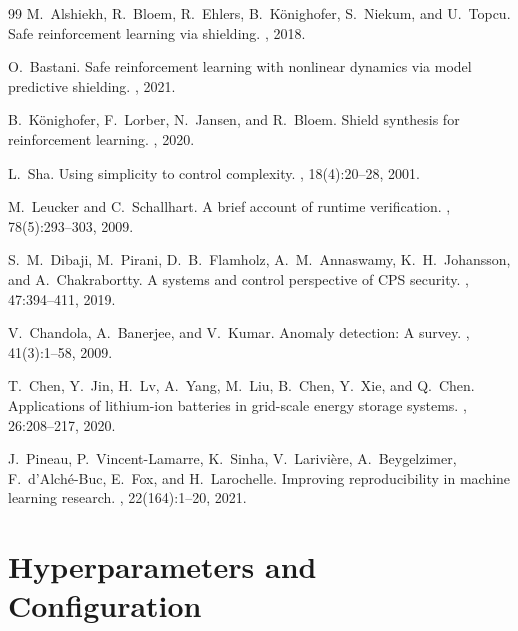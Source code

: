 \documentclass[11pt,a4paper,twocolumn]{article}
\begin{document}
\begin{thebibliography}{99}
M.~Alshiekh, R.~Bloem, R.~Ehlers, B.~K\"onighofer, S.~Niekum, and U.~Topcu.
\newblock Safe reinforcement learning via shielding.
, 2018.

O.~Bastani.
\newblock Safe reinforcement learning with nonlinear dynamics via model predictive shielding.
, 2021.

B.~K\"onighofer, F.~Lorber, N.~Jansen, and R.~Bloem.
\newblock Shield synthesis for reinforcement learning.
, 2020.

L.~Sha.
\newblock Using simplicity to control complexity.
, 18(4):20--28, 2001.

M.~Leucker and C.~Schallhart.
\newblock A brief account of runtime verification.
, 78(5):293--303, 2009.

S.~M.~Dibaji, M.~Pirani, D.~B.~Flamholz, A.~M.~Annaswamy, K.~H.~Johansson, and A.~Chakrabortty.
\newblock A systems and control perspective of {CPS} security.
, 47:394--411, 2019.

V.~Chandola, A.~Banerjee, and V.~Kumar.
\newblock Anomaly detection: A survey.
, 41(3):1--58, 2009.

T.~Chen, Y.~Jin, H.~Lv, A.~Yang, M.~Liu, B.~Chen, Y.~Xie, and Q.~Chen.
\newblock Applications of lithium-ion batteries in grid-scale energy storage systems.
, 26:208--217, 2020.

J.~Pineau, P.~Vincent-Lamarre, K.~Sinha, V.~Larivi\`ere, A.~Beygelzimer, F.~d'Alch\'e-Buc, E.~Fox, and H.~Larochelle.
\newblock Improving reproducibility in machine learning research.
, 22(164):1--20, 2021.

\end{thebibliography}

\appendix

\section{Hyperparameters and Configuration}\label{app:hyperparams}
\end{document}
